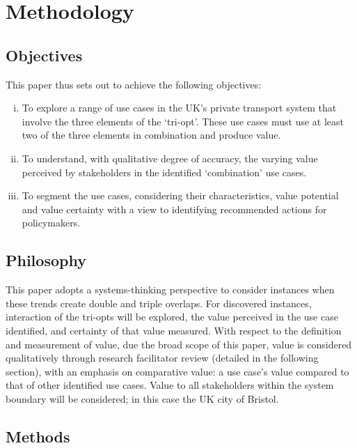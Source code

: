 \documentclass[b5paper,10pt]{article}
\begin{document}
\section{Methodology}\label{methodology}

\subsection{Objectives}

This paper thus sets out to achieve the following objectives:

\begin{enumerate}[i)]
\item To explore a range of use cases in the UK's private transport
system that involve the three elements of the `tri-opt'. These use
cases must use at least two of the three elements in combination and
produce value.
\item To understand, with qualitative degree of accuracy, the varying
value perceived by stakeholders in the identified `combination' use
cases.
\item To segment the use cases, considering their characteristics,
value potential and value certainty with a view to identifying
recommended actions for policymakers.
\end{enumerate}

\subsection{Philosophy}

This paper adopts a systems-thinking perspective to consider instances
when these trends create double and triple overlaps. For discovered
instances, interaction of the tri-opts will be explored, the value
perceived in the use case identified, and certainty of that value
measured. With respect to the definition and measurement of value, due
the broad scope of this paper, value is considered qualitatively
through research facilitator review (detailed in the following
section), with an emphasis on comparative value: a use case's value
compared to that of other identified use cases. Value to all
stakeholders within the system boundary will be considered; in this
case the UK city of Bristol.

\subsection{Methods}
\end{document}
